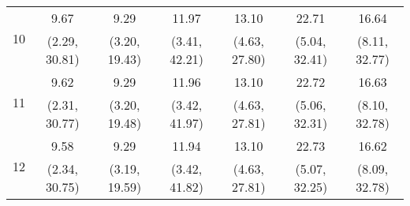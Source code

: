 \documentclass{article}
\begin{document}
\begin{table}
\begin{tabular}{ccccccc}
		\multirow{2}{*}{10} & 9.67 & 9.29 & 11.97 & 13.10 & 22.71 & 16.64\\
		 & (2.29, 30.81) & (3.20, 19.43) & (3.41, 42.21) & (4.63, 27.80) & (5.04, 32.41) & (8.11, 32.77)\\
		\multirow{2}{*}{11} & 9.62 & 9.29 & 11.96 & 13.10 & 22.72 & 16.63\\
		 & (2.31, 30.77) & (3.20, 19.48) & (3.42, 41.97) & (4.63, 27.81) & (5.06, 32.31) & (8.10, 32.78)\\
		\multirow{2}{*}{12} & 9.58 & 9.29 & 11.94 & 13.10 & 22.73 & 16.62\\
		 & (2.34, 30.75) & (3.19, 19.59) & (3.42, 41.82) & (4.63, 27.81) & (5.07, 32.25) & (8.09, 32.78)\\
	\end{tabular}
\label{tab:fevd-Model_PERR_Q_govexp-cpiAllQoq}
\end{table}
\end{document}
